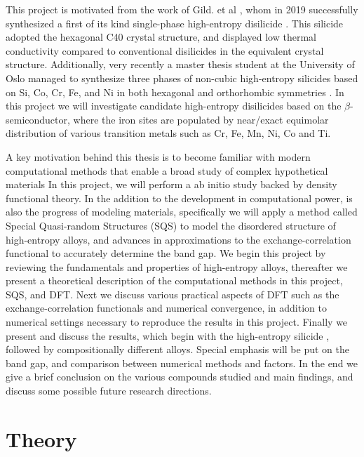 \documentclass[UKenglish]{ifimaster}  %
\begin{document}
This project is motivated from the work of Gild. et al \cite{GILD2019337}, whom in 2019 successfully synthesized a first of its kind single-phase high-entropy disilicide . This silicide adopted the hexagonal C40 crystal structure, and displayed low thermal conductivity compared to conventional disilicides in the equivalent crystal structure. Additionally, very recently a master thesis student at the University of Oslo managed to synthesize three phases of non-cubic high-entropy silicides based on Si, Co, Cr, Fe, and Ni in both hexagonal and orthorhombic symmetries \cite{mari}. In this project we will investigate candidate high-entropy disilicides based on the $\beta$- semiconductor, where the iron sites are populated by near/exact equimolar distribution of various transition metals such as Cr, Fe, Mn, Ni, Co and Ti.  

A key motivation behind this thesis is to become familiar with modern computational methods that enable a broad study of complex hypothetical materials  In this project, we will perform a ab initio study backed by density functional theory. In the addition to the development in computational power, is also the progress of modeling materials, specifically we will apply a method called Special Quasi-random Structures (SQS) to model the disordered structure of  high-entropy alloys, and advances in approximations to the exchange-correlation functional to accurately determine the band gap. We begin this project by reviewing the fundamentals and properties of high-entropy alloys, thereafter we present a theoretical description of the computational methods in this project, SQS, and DFT. Next we discuss various practical aspects of DFT such as the exchange-correlation functionals and numerical convergence, in addition to numerical settings necessary to reproduce the results in this project. Finally we present and discuss the results, which begin with the high-entropy silicide , followed by compositionally different alloys. Special emphasis will be put on the band gap, and comparison between numerical methods and factors. In the end we give a brief conclusion on the various compounds studied and main findings, and discuss some possible future research directions.   


\part{Theory}                    %



\end{document}
